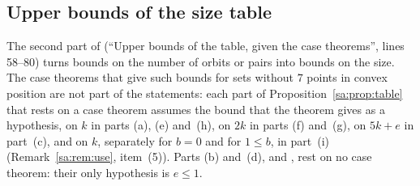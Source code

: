 \subsection{Upper bounds of the size table}\label{sa:ssec:table}

The second part of  (``Upper bounds of the table, given the case theorems'', lines 58--80) turns
bounds on the number of orbits or pairs into bounds on the size. The case theorems that give such bounds for sets
without $7$ points in convex position are not part of the statements: each part of Proposition~\ref{sa:prop:table}
that rests on a case theorem assumes the bound that the theorem gives as a hypothesis, on $k$ in parts (a), (e)
and~(h), on $2k$ in parts (f) and~(g), on $5k+e$ in part~(c), and on $k$, separately for $b=0$ and for $1\le b$, in
part~(i) (Remark~\ref{sa:rem:use}, item~(5)). Parts (b) and~(d),  and , rest on no
case theorem: their only hypothesis is $e\le1$.

